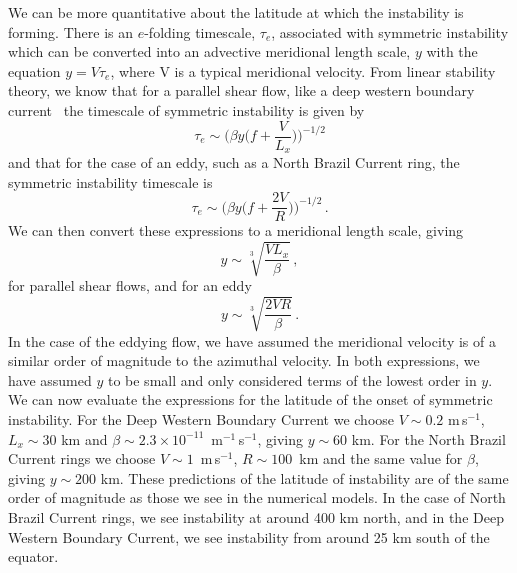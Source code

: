 We can be more quantitative about the latitude at which the instability is forming. There is an $e$-folding timescale, $\tau_e$, associated with symmetric instability which can be converted into an advective meridional length scale, $y$ with the equation $y = V \tau_e$, where V is a typical meridional velocity. From linear stability theory, we know that for a parallel shear flow, like a deep western boundary current~\citep{Hoskins1974} the timescale of symmetric instability is given by
\begin{equation}
    \tau_e \sim \Bigg(\beta y \bigg(f + \frac{V}{L_x}\bigg) \Bigg)^{-1/2}
\end{equation}
and that for the case of an eddy, such as a North Brazil Current ring, the symmetric instability timescale is~\citep{Buckingham2021}
\begin{equation}
    \tau_e \sim \Bigg(\beta y \bigg(f + \frac{2 V}{R}\bigg) \Bigg)^{-1/2} \, .
\end{equation}
We can then convert these expressions to a meridional length scale, giving
\begin{equation}
    y \sim \sqrt[3]{\frac{V L_x}{\beta}} \, ,
    \label{eq:dwbc_y}
\end{equation}
for parallel shear flows, and for an eddy
\begin{equation}
    y \sim \sqrt[3]{\frac{2 V R}{\beta}} \, .
    \label{eq:nbc_y}
\end{equation}
In the case of the eddying flow, we have assumed the meridional velocity is of a similar order of magnitude to the azimuthal velocity. In both expressions, we have assumed $y$ to be small and only considered terms of the lowest order in $y$. We can now evaluate the expressions for the latitude of the onset of symmetric instability. For the Deep Western Boundary Current we choose $V \sim 0.2$ m\,s$^{-1}$, $L_x \sim 30$ km and $\beta \sim 2.3 \times 10^{-11}$~m$^{-1}$\,s$^{-1}$, giving $y \sim 60$ km. For the North Brazil Current rings we choose $V \sim 1$~m\,s$^{-1}$, $R \sim 100$~km and the same value for $\beta$, giving $y \sim 200$ km. These predictions of the latitude of instability are of the same order of magnitude as those we see in the numerical models. In the case of North Brazil Current rings, we see instability at around 400 km north, and in the Deep Western Boundary Current, we see instability from around 25 km south of the equator.

